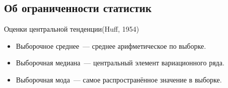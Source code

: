 \documentclass[11pt,pdf,utf8,hyperref={unicode},aspectratio=169]{beamer}
\begin{document}
\subsection{Об ограниченности статистик}
\begin{frame}{Оценки центральной тенденции}{(Huff, 1954)}
    \begin{multicols}{2}
    \begin{itemize}
        \item Выборочное среднее~--- среднее арифметическое по выборке.
        \item Выборочная медиана~--- центральный элемент вариационного ряда.
        \item Выборочная мода~--- самое распространённое значение в выборке.
    \end{itemize}
    \columnbreak
    \begin{center}

\end{center}
\end{multicols}
\end{frame}
\end{document}
